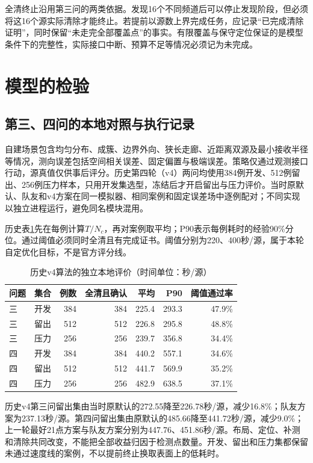 \documentclass{JXUSTmodeling}
\begin{document}
全清终止沿用第三问的两类依据。发现16个不同频道后可以停止发现阶段，但必须将这16个源实际清除才能终止。若提前以源数上界完成任务，应记录“已完成清除证明”，同时保留“未走完全部覆盖点”的事实。有限覆盖与保守定位保证的是模型条件下的完整性，实际接口中断、预算不足等情况必须记为未完成。


\section{模型的检验}\label{sec:6}

\subsection{第三、四问的本地对照与执行记录}
\label{sub:verify-p34}
自建场景包含均匀分布、成簇、边界外向、狭长走廊、近距离双源及最小接收半径等情况，测向误差包括空间相关误差、固定偏置与极端误差。策略仅通过观测接口行动，源真值仅供事后评分。历史第四轮（v4）两问均使用384例开发、512例留出、256例压力样本，只用开发集选型，冻结后才开启留出与压力评价。当时原默认、队友和v4方案在同一模拟器、相同案例和固定误差场中逐例配对；不同实现以独立进程运行，避免同名模块混用。

历史表\ref{tab:search-local}先在每例计算$T/N_c$，再对案例取平均；P90表示每例耗时的经验90\%分位。通过阈值必须同时全清且有完成证书。阈值分别为220、400秒/源，属于本轮自定优化目标，不是官方评分线。

\begin{table}[htbp]
\centering\small
\caption{历史v4算法的独立本地评价（时间单位：秒/源）}
\label{tab:search-local}
\begin{tabular}{llrrrrr}
\toprule
问题 & 集合 & 例数 & 全清且确认 & 平均 & P90 & 阈值通过率\\
\midrule
三 & 开发 & 384 & 384 & 225.4 & 293.3 & 47.9\%\\
三 & 留出 & 512 & 512 & 226.8 & 295.8 & 48.8\%\\
三 & 压力 & 256 & 256 & 239.7 & 356.8 & 34.4\%\\
四 & 开发 & 384 & 384 & 440.2 & 557.1 & 34.6\%\\
四 & 留出 & 512 & 512 & 441.7 & 569.9 & 35.2\%\\
四 & 压力 & 256 & 256 & 482.9 & 638.5 & 37.1\%\\
\bottomrule
\end{tabular}
\end{table}

历史v4第三问留出集由当时原默认的272.55降至226.78秒/源，减少16.8\%；队友方案为237.13秒/源。第四问留出集由原默认的485.66降至441.72秒/源，减少9.0\%；上一轮最好21点方案与队友方案分别为447.76、451.86秒/源。布局、定位、补测和清除共同改变，不能把全部收益归因于检测点数量。开发、留出和压力集都保留未通过速度线的案例，不以提前终止换取表面上的低耗时。
\end{document}
